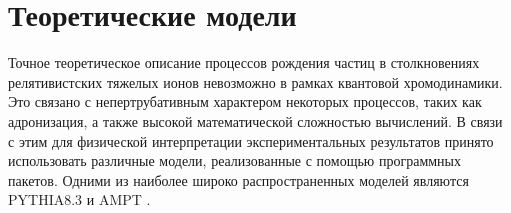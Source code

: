 \begin{comment}
	\section{Рождение частиц в столкновениях релятивистских ионов}
	\section{Отношения частиц и химическое равновесие}
	Различия между механизмами рождения различных адронов могут быть установлены с помощью отношения их инвариантных спектров по поперечному импульсу. Установлено [], что отношения рожденных адронов хорошо описываются простой статистической моделью [].
	\begin{figure}[ht] 
		\centerfloat
		\includegraphics [width = 0.9\linewidth] {Intro/RatiosExp.png}
		\caption{Отношения выходов адронов. Сравнение между статистической моделью (горизонтальные линии) и экспериментальными отношениями (круги)} 
		\label{img:RatiosExp}  
	\end{figure}
	
	Статистическая модель основана на использовании большого канонического ансамбля для описания статистической суммы и, следовательно, плотности частиц вида $i$ в равновесном состоянии кварк-глонной материи:
	\begin{equation}
		\label{eq:Ratio}
		n_i = \frac{g_i}{2 \pi ^2}\int_0^{\infty} \frac{p^2 dp}{exp[(E_i - \mu_i)/T_{ch}]\pm 1}
	\end{equation}
	где  $n_i$ - плотность частиц, $g_i$ - спиновое вырождение, $p$ - импульс, $E$ - полная энергия и $\mu_i =\mu_B B_i - \mu_S S_i - \mu_{I_3} I_{3i}$ - химический потенциал. Величины $B_i$, $S_i$ и $I_{3i}$ представляют собой барионное число, странность и третью компоненту изоспина для частицы вида $i$. В данной модели присутствуют только два параметра: температура $T_{ch}$ и барионный химический потенциал $\mu_B$, которые являются независимыми.  На рис. ??? показано сравнение измеренных интегральных отношений выходов частиц частиц и расчетов согласно статистической модели. Как видно из рисунка, данная модель хорошо согласовывается с экспериментальными данными.
	Совпадаение экспериментальных данных с расчетсами статистической модели указывает на сохранение химического равновесия в системе. 
\end{comment}

\section{Теоретические модели}
Точное теоретическое описание процессов рождения частиц в столкновениях релятивистских тяжелых ионов невозможно в рамках квантовой хромодинамики. Это связано с непертрубативным характером некоторых процессов, таких как адронизация, а также высокой математической сложностью вычислений. В связи с этим для физической интерпретации экспериментальных результатов принято использовать различные модели, реализованные с помощью программных пакетов. Одними из наиболее широко распространенных моделей являются PYTHIA8.3 \cite{pythia} и AMPT \cite{AMPT}.

